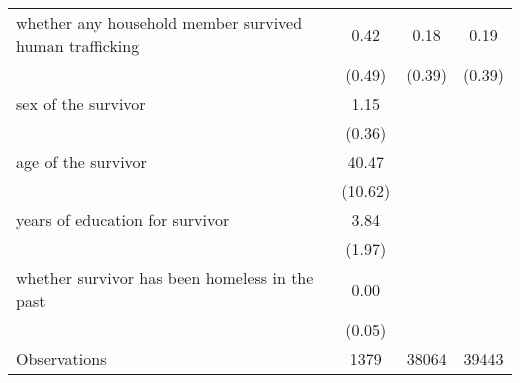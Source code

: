 \begin{table}[htbp]
\begin{tabular}{l*{3}{c}}
whether any household member survived human trafficking&        0.42&        0.18&        0.19\\
                    &      (0.49)&      (0.39)&      (0.39)\\
sex of the survivor &        1.15&            &            \\
                    &      (0.36)&            &            \\
age of the survivor &       40.47&            &            \\
                    &     (10.62)&            &            \\
years of education for survivor&        3.84&            &            \\
                    &      (1.97)&            &            \\
whether survivor has been homeless in the past&        0.00&            &            \\
                    &      (0.05)&            &            \\
\hline
Observations        &        1379&       38064&       39443\\
\hline\hline
\end{tabular}
\end{table}
